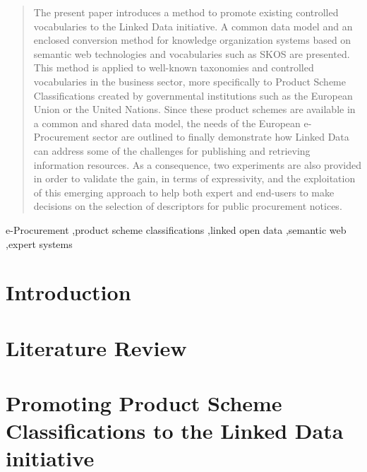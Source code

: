 \documentclass[preprint,12pt]{elsarticle}
\begin{document}
\begin{frontmatter}
\address{}

\begin{abstract}
The present paper introduces a method to promote existing controlled vocabularies to 
the Linked Data initiative. A common data model and an enclosed conversion 
method for knowledge organization systems based on semantic web technologies and 
vocabularies such as SKOS are presented. This method is applied to well-known 
taxonomies and controlled vocabularies in the business sector, more specifically 
to Product Scheme Classifications created by governmental institutions such as 
the European Union or the United Nations. Since these product schemes are 
available in a common and shared data model, the needs of the European 
e-Procurement sector are outlined to finally demonstrate how Linked Data can 
address some of the challenges for publishing and retrieving information 
resources. As a consequence, two experiments are also provided in order to 
validate the gain, in terms of expressivity, and the exploitation of this emerging 
approach to help both expert and end-users to make decisions on the selection of descriptors 
for public procurement notices.
\end{abstract}

\begin{keyword}
e-Procurement \sep product scheme classifications \sep  linked open data \sep  semantic web \sep expert systems


\end{keyword}


\end{frontmatter}

\section{Introduction}

\section{Literature Review}\label{sect:related-work}

\section{Promoting Product Scheme Classifications to the Linked Data initiative}\label{sect:use-case}
\end{document}
